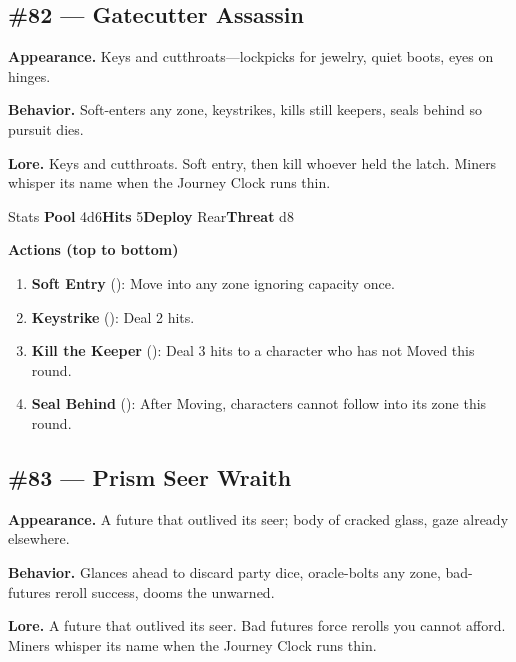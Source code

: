 \subsection*{\#82 --- Gatecutter Assassin}

\textbf{Appearance.} Keys and cutthroats---lockpicks for jewelry, quiet boots, eyes on hinges.

\textbf{Behavior.} Soft-enters any zone, keystrikes, kills still keepers, seals behind so pursuit dies.

\textbf{Lore.} Keys and cutthroats. Soft entry, then kill whoever held the latch. Miners whisper its name when the Journey Clock runs thin.

\begin{monsterentry}{Stats}
\textbf{Pool} 4d6\quad\textbf{Hits} 5\quad\textbf{Deploy} Rear\quad\textbf{Threat} d8

\textbf{Actions (top to bottom)}
\begin{enumerate}\setlength{\itemsep}{0.15em}\setlength{\parskip}{0pt}
  \item \textbf{Soft Entry} (\easy): Move into any zone ignoring capacity once.
  \item \textbf{Keystrike} (\medium): Deal 2 hits.
  \item \textbf{Kill the Keeper} (\hard): Deal 3 hits to a character who has not Moved this round.
  \item \textbf{Seal Behind} (\medium): After Moving, characters cannot follow into its zone this round.
\end{enumerate}
\end{monsterentry}

\subsection*{\#83 --- Prism Seer Wraith}

\textbf{Appearance.} A future that outlived its seer; body of cracked glass, gaze already elsewhere.

\textbf{Behavior.} Glances ahead to discard party dice, oracle-bolts any zone, bad-futures reroll success, dooms the unwarned.

\textbf{Lore.} A future that outlived its seer. Bad futures force rerolls you cannot afford. Miners whisper its name when the Journey Clock runs thin.

